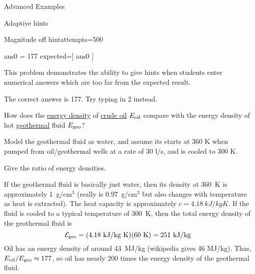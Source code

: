 \begin{edXchapter}{Advanced Examples}
\begin{edXsection}{Adaptive hints}
\begin{edXvertical}

\begin{edXproblem}{Magnitude off hint}{attempts=500}

\begin{edXscript}
ans0 = 177
expected=[ ans0 ]
\end{edXscript}


This problem demonstrates the ability to give hints when students
enter numerical answers which are too far from the expected result.

The correct answer is 177.  Try typing in 2 instead.

How does the \href{http://en.wikipedia.org/wiki/Energy_density}{energy
  density} of \href{http://en.wikipedia.org/wiki/Petroleum}{crude oil}
$E_{\rm oil}$ compare with the energy density of hot
\href{http://en.wikipedia.org/wiki/Geothermal_energy}{geothermal}
fluid $E_{\rm geo}$?

Model the geothermal fluid as water, and assume its starts at 360 K
when pumped from oil/geothermal wells at a rate of 30 l/s, and is
cooled to 300 K.

Give the ratio of energy densities.

  
 
\begin{edXsolution}

  If the geothermal fluid is basically just water, then its density at
  360~K is approximately 1~g/cm$^3$ (really is 0.97~g/cm$^3$ but also
  changes with temperature as heat is extracted). The heat capacity is
  approximately $c = 4.18~kJ/kg K$. If the fluid is cooled to a
  typical temperature of 300~K, then the total energy density of the
  geothermal fluid is
\begin{equation}
\mathcal{E}_{\rm geo} = \rm(4.18~kJ/kg~K)(60~K) = 251~kJ/kg
\end{equation}
Oil has an energy density of around 43~MJ/kg (wikipedia gives 46
MJ/kg).  Thus, $E_{\rm oil}/E_{\rm geo} \approx 177$, so oil has
nearly 200 times the energy density of the geothermal fluid.  

\end{edXsolution}

\end{edXproblem}


\end{edXvertical}
\end{edXsection}
\end{edXchapter}
